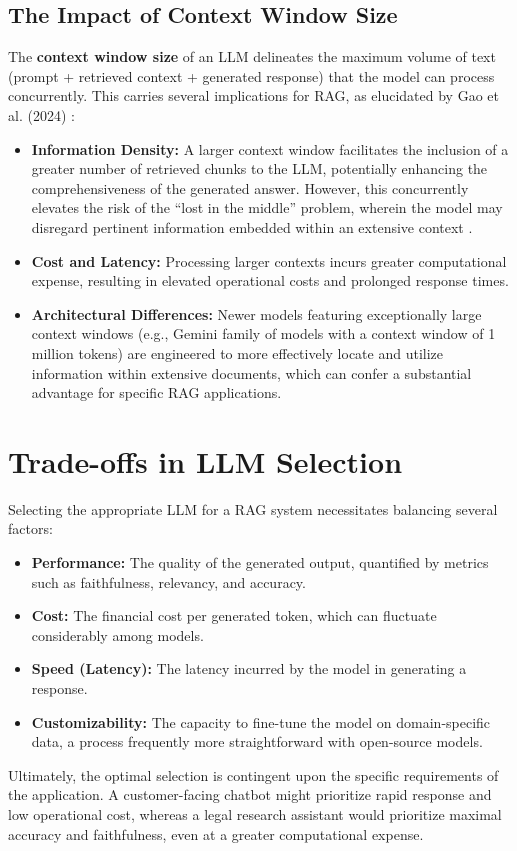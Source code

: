 \subsection{The Impact of Context Window Size}
The \textbf{context window size} of an LLM delineates the maximum volume of text (prompt + retrieved context + generated response) that the model can process concurrently. This carries several implications for RAG, as elucidated by Gao et al. (2024) \autocite{gao2024retrievalaugmentedgenerationlargelanguage}:
\begin{itemize}
    \item \textbf{Information Density:} A larger context window facilitates the inclusion of a greater number of retrieved chunks to the LLM, potentially enhancing the comprehensiveness of the generated answer. However, this concurrently elevates the risk of the \enquote{lost in the middle} problem, wherein the model may disregard pertinent information embedded within an extensive context \autocite{liu2023lostmiddlelanguagemodels}.
    \item \textbf{Cost and Latency:} Processing larger contexts incurs greater computational expense, resulting in elevated operational costs and prolonged response times.
    \item \textbf{Architectural Differences:} Newer models featuring exceptionally large context windows (e.g., Gemini family of models with a context window of 1 million tokens) are engineered to more effectively locate and utilize information within extensive documents, which can confer a substantial advantage for specific RAG applications.
\end{itemize}

\section{Trade-offs in LLM Selection}
Selecting the appropriate LLM for a RAG system necessitates balancing several factors:
\begin{itemize}
    \item \textbf{Performance:} The quality of the generated output, quantified by metrics such as faithfulness, relevancy, and accuracy.
    \item \textbf{Cost:} The financial cost per generated token, which can fluctuate considerably among models.
    \item \textbf{Speed (Latency):} The latency incurred by the model in generating a response.
    \item \textbf{Customizability:} The capacity to fine-tune the model on domain-specific data, a process frequently more straightforward with open-source models.
\end{itemize}

Ultimately, the optimal selection is contingent upon the specific requirements of the application. A customer-facing chatbot might prioritize rapid response and low operational cost, whereas a legal research assistant would prioritize maximal accuracy and faithfulness, even at a greater computational expense.
